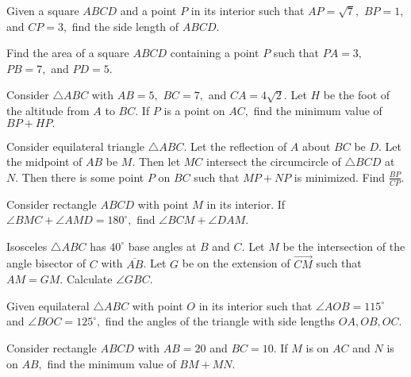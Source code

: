 \documentclass{article}
\begin{document}
    \begin{prob}[]{4}
Given a square $ABCD$ and a point $P$ in its interior such that $AP=\sqrt{7},$ $BP=1,$ and $CP=3,$ find the side length of $ABCD.$
\end{prob}

	 \begin{prob}[]{4}
     Find the area of a square $ABCD$ containing a point $P$ such that $PA=3,$ $PB=7,$ and $PD=5.$
    \end{prob}

    \begin{prob}[ART 2019/3]{4}
Consider $\triangle ABC$ with $AB=5,$ $BC=7,$ and $CA=4\sqrt{2}.$ Let $H$ be the foot of the altitude from $A$ to $BC.$ If $P$ is a point on $AC,$ find the minimum value of $BP+HP.$
\end{prob}
    
    \begin{prob}[ART 2020/2]{4}
Consider equilateral triangle $\triangle ABC.$ Let the reflection of $A$ about $BC$ be $D.$ Let the midpoint of $AB$ be $M.$ Then let $MC$ intersect the circumcircle of $\triangle BCD$ at $N.$ Then there is some point $P$ on $BC$ such that $MP+NP$ is minimized. Find $\frac{BP}{CP}.$
\end{prob}

    \begin{prob}[MOP]{4}
Consider rectangle $ABCD$ with point $M$ in its interior. If $\angle BMC+\angle AMD=180^{\circ},$ find $\angle BCM+\angle DAM.$
\end{prob}

    \begin{prob}[]{4}
Isosceles $\triangle ABC$ has $40^\circ$ base angles at $B$ and $C$. Let $M$ be the intersection of the angle bisector of $C$ with $\overline{AB}$. Let $G$ be on the extension of $\overrightarrow{CM}$ such that $AM = GM$. Calculate $\angle GBC$.
\end{prob}

    \begin{prob}[]{4}
    Given equilateral $\triangle ABC$ with point $O$ in its interior such that $\angle AOB=115^{\circ}$ and $\angle BOC=125^{\circ},$ find the angles of the triangle with side lengths $OA,OB,OC.$
    \end{prob}
    
    \begin{prob}[]{4}
    Consider rectangle $ABCD$ with $AB=20$ and $BC=10.$ If $M$ is on $AC$ and $N$ is on $AB,$ find the minimum value of $BM+MN.$
    \end{prob}
\end{document}
